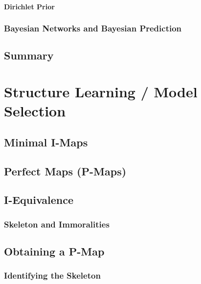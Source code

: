				\paragraph{Dirichlet Prior} %

			\subsubsection{Bayesian Networks and Bayesian Prediction} %

		\subsection{Summary} %

	\section{Structure Learning / Model Selection} %

		\subsection{Minimal I-Maps} %

		\subsection{Perfect Maps (P-Maps)} %

		\subsection{I-Equivalence} %

			\subsubsection{Skeleton and Immoralities} %

		\subsection{Obtaining a P-Map} %

			\subsubsection{Identifying the Skeleton} %


